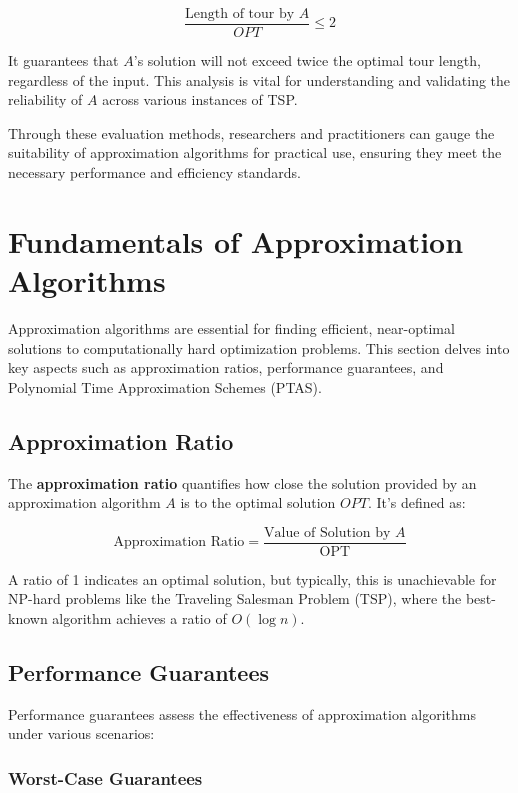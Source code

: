 \documentclass[12pt]{book} %
\begin{document}
\[
\frac{\text{Length of tour by } A}{OPT} \leq 2
\]

It guarantees that \(A\)'s solution will not exceed twice the optimal tour length, regardless of the input. This analysis is vital for understanding and validating the reliability of \(A\) across various instances of TSP.

Through these evaluation methods, researchers and practitioners can gauge the suitability of approximation algorithms for practical use, ensuring they meet the necessary performance and efficiency standards.


\section{Fundamentals of Approximation Algorithms}

Approximation algorithms are essential for finding efficient, near-optimal solutions to computationally hard optimization problems. This section delves into key aspects such as approximation ratios, performance guarantees, and Polynomial Time Approximation Schemes (PTAS).

\subsection{Approximation Ratio}

The \textbf{approximation ratio} quantifies how close the solution provided by an approximation algorithm \(A\) is to the optimal solution \(OPT\). It's defined as:

\[
\text{Approximation Ratio} = \frac{\text{Value of Solution by } A}{\text{OPT}}
\]

A ratio of 1 indicates an optimal solution, but typically, this is unachievable for NP-hard problems like the Traveling Salesman Problem (TSP), where the best-known algorithm achieves a ratio of \(O(\log n)\).

\subsection{Performance Guarantees}

Performance guarantees assess the effectiveness of approximation algorithms under various scenarios:

\subsubsection{Worst-Case Guarantees}
\end{document}
